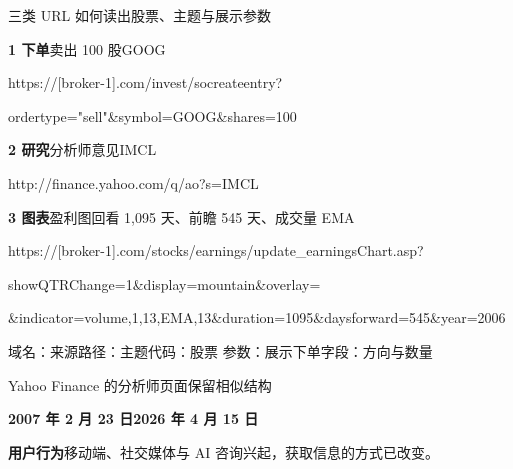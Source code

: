 \newcommand{\udomain}[1]{\textcolor{quiet}{#1}}
\newcommand{\upath}[1]{\textcolor{sampleteal}{#1}}
\newcommand{\ucode}[1]{\textcolor{sampleblue}{#1}}
\newcommand{\uparam}[1]{\textcolor{samplegold}{#1}}
\newcommand{\utrade}[1]{\textcolor{wine}{#1}}
\begin{frame}[label=urls]{三类 URL 如何读出股票、主题与展示参数}
  {\small\textbf{1 下单}\quad\utrade{卖出 100 股}\quad\ucode{GOOG}\par}
  {\fontsize{8}{10}\selectfont\ttfamily
  \udomain{https://[broker-1].com}\upath{/invest/socreateentry?}\par
  \utrade{ordertype="sell"}\ucode{\&symbol=GOOG}\utrade{\&shares=100}\par}
  \smallskip
  {\small\textbf{2 研究}\quad\upath{分析师意见}\quad\ucode{IMCL}\par}
  {\fontsize{8}{10}\selectfont\ttfamily
  \udomain{http://finance.yahoo.com}\upath{/q/ao?}\ucode{s=IMCL}\par}
  \medskip
  {\small\textbf{3 图表}\quad\upath{盈利图}\quad\uparam{回看 1,095 天、前瞻 545 天、成交量 EMA}\par}
  {\fontsize{8}{10}\selectfont\ttfamily
  \udomain{https://[broker-1].com}\upath{/stocks/earnings/update\_earningsChart.asp?}\par
  \uparam{showQTRChange=1\&display=mountain\&overlay=}\par
  \uparam{\&indicator=volume,1,13,EMA,13\&duration=1095\&daysforward=545\&year=2006}\par}
  \smallskip{\small }\par\medskip
  {\footnotesize\udomain{域名：来源}\quad\upath{路径：主题}\quad\ucode{代码：股票}\quad
   \uparam{参数：展示}\quad\utrade{下单字段：方向与数量}}
\end{frame}

\begin{frame}[label=yahoo]{Yahoo Finance 的分析师页面保留相似结构}
  {\centering
  \par}
  {\small\textbf{2007 年 2 月 23 日}\hfill\textbf{2026 年 4 月 15 日}\par}\smallskip
       {\small\textbf{用户行为}\quad 移动端、社交媒体与 AI 咨询兴起，获取信息的方式已改变。}
\end{frame}

